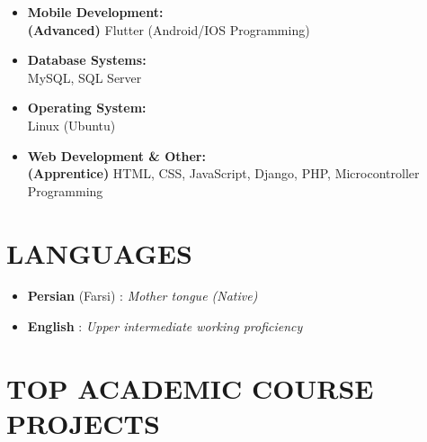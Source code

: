 \documentclass[margin]{res}
\begin{document}
\begin{resume}
\begin{itemize}
\item \textbf{Mobile Development:}\\
\textbf{(Advanced) }Flutter (Android/IOS Programming)\\

\item \textbf{Database Systems:}\\
MySQL, SQL Server\\

\item \textbf{Operating System:}\\
Linux (Ubuntu)\\

\item \textbf{Web Development \& Other:}\\
\textbf{(Apprentice) }HTML, CSS, JavaScript, Django, PHP, Microcontroller Programming\\
	
\end{itemize}



\section{LANGUAGES}

\begin{itemize} \itemsep +3pt

\item \textbf{Persian} (Farsi) : \textit{Mother tongue (Native)}
\item \textbf{English} : \textit{Upper intermediate working proficiency}

\end{itemize} 



\section{TOP ACADEMIC COURSE PROJECTS}


\end{resume}
\end{document}

